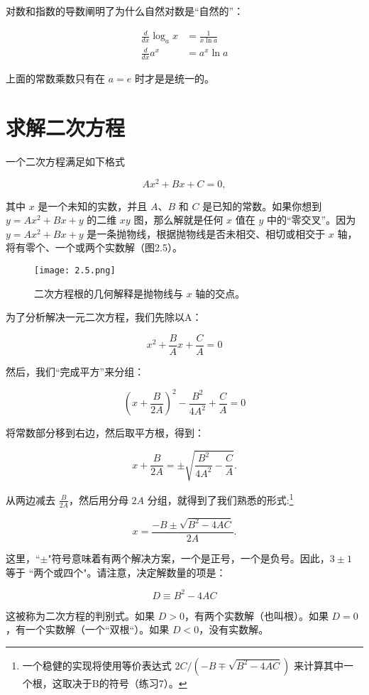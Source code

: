 \documentclass[lang=cn,10pt]{elegantbook}
\begin{document}
对数和指数的导数阐明了为什么自然对数是“自然的”：


$$
\begin{aligned}
\frac{d}{d x} \log _{a} x &=\frac{1}{x \ln a} \\
\frac{d}{d x} a^{x} &=a^{x} \ln a
\end{aligned}
$$

上面的常数乘数只有在 $a = e$ 时才是是统一的。

\section{求解二次方程}

一个二次方程满足如下格式

$$Ax^2+Bx+C=0,$$

其中 $x$ 是一个未知的实数，并且 $A$、$B$ 和 $C$ 是已知的常数。如果你想到 $y=Ax^2+Bx+y$ 的二维 $xy$ 图，那么解就是任何 $x$ 值在 $y$ 中的“零交叉”。因为 $y=Ax^2+Bx+y$ 是一条抛物线，根据抛物线是否未相交、相切或相交于 $x$ 轴，将有零个、一个或两个实数解（图2.5）。

\begin{figure}[htbp]
\centering
\texttt{[image: 2.5.png]}
\caption{二次方程根的几何解释是抛物线与 $x$ 轴的交点。}
\end{figure}

为了分析解决一元二次方程，我们先除以A：

$$x^2+\frac{B}{A} x+\frac{C}{A}=0$$

然后，我们“完成平方”来分组：

$$\left(x+\frac{B}{2 A}\right)^{2}-\frac{B^{2}}{4 A^{2}}+\frac{C}{A}=0$$

将常数部分移到右边，然后取平方根，得到：

$$
x+\frac{B}{2 A}=\pm \sqrt{\frac{B^{2}}{4 A^{2}}-\frac{C}{A}} .
$$

从两边减去 $\frac{B}{2 A}$，然后用分母 $2A$ 分组，就得到了我们熟悉的形式:\footnote{一个稳健的实现将使用等价表达式 $2 C /\left(-B \mp \sqrt{B^{2}-4 A C}\right)$ 来计算其中一个根，这取决于B的符号（练习7）。}


\begin{equation} x=\frac{-B \pm \sqrt{B^{2}-4 A C}}{2 A} . \end{equation}

这里，``$\pm$"符号意味着有两个解决方案，一个是正号，一个是负号。因此，$3\pm1$ 等于 ``两个或四个"。请注意，决定解数量的项是：

$$
D \equiv B^{2}-4 A C
$$

这被称为二次方程的判别式。如果 $D>0$，有两个实数解（也叫根）。如果 $D=0$，有一个实数解（一个``双根“）。如果 $D<0$，没有实数解。
\end{document}
